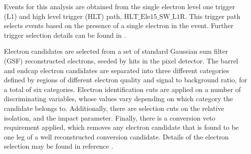 \documentclass{cmspaper}
\begin{document}
Events for this analysis are obtained from the single electron level one trigger (L1) and high level trigger (HLT) path, $\mathrm{HLT\_Ele15\_SW\_L1R}$. This trigger path selects events based on the presence of a single electron in the event. Further trigger selection details can be found in \cite{HLTReference}.

\label{sec:ElectronSelection}

Electron candidates are selected from a set of standard Gaussian sum filter (GSF) reconstructed electrons, seeded by hits in the pixel detector. The barrel and endcap electron candidates are separated into three different categories defined by regions of different electron quality and signal to background ratio, for a total of six categories. Electron identification cuts are applied on a number of discriminating variables, whose values vary depending on which category the candidate belongs to. Additionally, there are selection cuts on the relative isolation, and the impact parameter. Finally, there is a conversion veto requirement applied, which removes any electron candidate that is found to be one leg of a well reconstructed conversion candidate. Details of the electron selection may be found in reference \cite{VVXsectionNote}.


\end{document}
